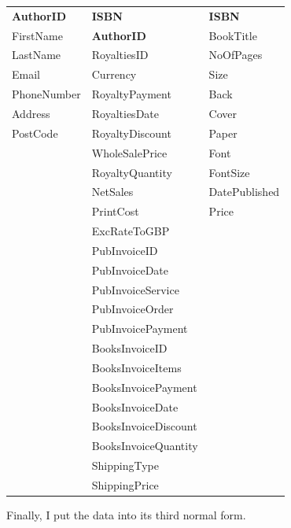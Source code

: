 \begin{tabular}{|p{2.5cm}|p{3.5cm}|p{2.5cm}|}
    \hline
    \textbf{AuthorID} & \textbf{ISBN} & \textbf{ISBN} \\
    FirstName & \textbf{AuthorID} & BookTitle \\
    LastName & RoyaltiesID & NoOfPages \\
    Email  & Currency & Size \\
    PhoneNumber & RoyaltyPayment & Back \\
    Address & RoyaltiesDate & Cover \\
    PostCode & RoyaltyDiscount & Paper \\
    & WholeSalePrice & Font \\
    & RoyaltyQuantity & FontSize \\
    & NetSales & DatePublished \\
    & PrintCost & Price \\
    & ExcRateToGBP & \\
    & PubInvoiceID & \\
    & PubInvoiceDate & \\
    & PubInvoiceService & \\
    & PubInvoiceOrder & \\
    & PubInvoicePayment & \\
    & BooksInvoiceID & \\
    & BooksInvoiceItems & \\
    & BooksInvoicePayment & \\
    & BooksInvoiceDate & \\
    & BooksInvoiceDiscount & \\
    & BooksInvoiceQuantity & \\
    & ShippingType & \\
    & ShippingPrice & \\
    \hline
\end{tabular}

\newpage
Finally, I put the data into its third normal form.

